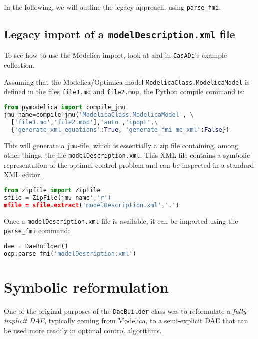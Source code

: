 \documentclass[a4paper,12pt]{book}
\newcommand{\CasADi}{\texttt{CasADi}\xspace}
\newcommand{\python}[1]{\lstinline[language=Python]{#1}}
\begin{document}
In the following, we will outline the legacy approach, using
\lstinline[language=Python]{parse_fmi}.

\subsection*{Legacy import of a \texttt{modelDescription.xml} file}
To see how to use the Modelica import, look at  and  in \CasADi's example collection.

Assuming that the Modelica/Optimica model \texttt{ModelicaClass.ModelicaModel} is defined in the files \texttt{file1.mo} and \texttt{file2.mop}, the Python compile command is:
\begin{lstlisting}[language=Python]
from pymodelica import compile_jmu
jmu_name=compile_jmu('ModelicaClass.ModelicaModel', \
  ['file1.mo','file2.mop'],'auto','ipopt',\
  {'generate_xml_equations':True, 'generate_fmi_me_xml':False})
\end{lstlisting}

This will generate a \texttt{jmu}-file, which is essentially a zip file containing, among other things, the file \texttt{modelDescription.xml}. This XML-file contains a symbolic representation of the optimal control problem and can be inspected in a standard XML editor.
\begin{lstlisting}[language=Python]
from zipfile import ZipFile
sfile = ZipFile(jmu_name','r')
mfile = sfile.extract('modelDescription.xml','.')
\end{lstlisting}

Once a \texttt{modelDescription.xml} file is available, it can be imported
using the \python{parse_fmi} command:

\begin{lstlisting}[language=Python]
dae = DaeBuilder()
ocp.parse_fmi('modelDescription.xml')
\end{lstlisting}

\section{Symbolic reformulation}
One of the original purposes of the \texttt{DaeBuilder} class was to reformulate
a \emph{fully-implicit DAE}, typically coming from Modelica, to a semi-explicit
DAE that can be used more readily in optimal control algorithms.
\end{document}
